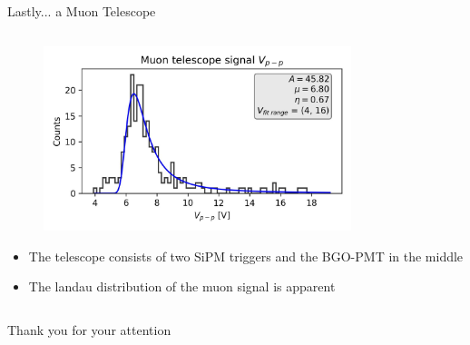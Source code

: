 \begin{columnframe}{Lastly... a Muon Telescope}
\begin{column}{0.5\textwidth}
\begin{figure}
            \includegraphics[width=0.8\textwidth, frame]{images/landau_fit.jpg}
        \end{figure}
        \begin{itemize}
            \item The telescope consists of two SiPM triggers and the BGO-PMT in the middle
            \item The landau distribution of the muon signal is apparent
        \end{itemize}
    \end{column}
\end{columnframe}


\begin{frame}{}
    \centering
    \Large{Thank you for your attention}
\end{frame}


